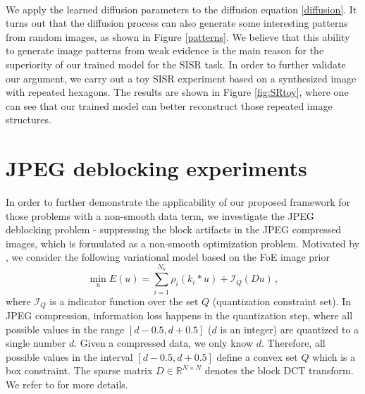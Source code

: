\documentclass[10pt,journal,compsoc]{IEEEtran}
\newcommand{\cI}{\mathcal{I}}
\newcommand{\R}{\mathbb{R}}
\newcommand{\suml}[2]{\sum\limits_{#1}^{#2}}
\begin{document}
\begin{figure*}[t!]
\centering
    \hfill
    \hfill
    \hfill
    \hfill
    \hfill
    \\
\vspace*{-0.25cm}
    \caption{A toy experiment on a synthesized image with repeated hexagons for the upscaling factor $\times 3$.}\label{fig:SRtoy}
\end{figure*}

We apply the learned diffusion parameters to the diffusion equation \eqref{diffusion}. It turns out that 
the diffusion process can also generate some interesting patterns from random images, as shown in Figure \ref{patterns}. 
We believe that this 
ability to generate image patterns from weak evidence is the main reason for the superiority of our trained model for the 
SISR task. In order to further validate our argument, we carry out a toy SISR experiment based on a synthesized image 
with repeated hexagons. The results are shown in Figure \ref{fig:SRtoy}, where one can see that our trained model can better 
reconstruct those repeated image structures. 
\vspace*{-0.3cm}
\section{JPEG deblocking experiments}\label{JPEG}
In order to further demonstrate the applicability of our proposed framework for those problems with a non-smooth data term, 
we investigate the JPEG deblocking problem - suppressing the block artifacts in the JPEG compressed images, which is 
formulated as a non-smooth optimization problem. 
Motivated by \cite{BrediesH12}, we consider the following variational model based on the FoE image prior 
\begin{equation}\label{vbdeblocking}
\min\limits_{u}E(u) = 
\suml{i=1}{N_k}\rho_i(k_i * u) + \cI_{Q} (Du)\,,
\end{equation}
where $\cI_{Q}$ is a indicator function over the set $Q$ (quantization constraint set). In JPEG compression, information loss 
happens in the quantization step, where all possible values in the range $[d - 0.5, d + 0.5]$ ($d$ is an integer) are quantized to a 
single number $d$. Given a compressed data, we only know $d$. Therefore, all possible values in the interval $[d - 0.5, d + 0.5]$ 
define a convex set $Q$ which is a box constraint. The sparse matrix 
$D \in \R^{N \times N}$ denotes the block DCT transform. We refer to \cite{BrediesH12} for more details. 
\end{document}
